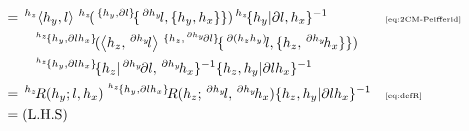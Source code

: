 \documentclass[11pt, reqno]{amsart} %
\newcommand{\act}[1]{\,\sp{#1}\!}
\theoremstyle{definition}
\theoremstyle{remark}
\numberwithin{equation}{section}
\begin{document}
\begin{align*}
  &= \act{h_z}\left<h_y,l\right>\act{h_z}(\act{\{h_y,\partial l\}}\{\act{\partial h_y}l,\{h_y,h_x\}\})\act{h_z}\{h_y|\partial l,h_x\}^{-1} & &\text{\tiny \eqref{eq:2CM-Peifferid}} \\
  &\qquad  \act{\act{h_z}\{h_y,\partial lh_x\}}(\left<h_z,\act{\partial h_y}l\right>\act{\{h_z,\act{\partial h_y}\partial l\}}\{\act{\partial (h_zh_y)}l,\{h_z,\act{\partial h_y}h_x\}\}) \\
  &\qquad 
  \act{\act{h_z}\{h_y,\partial lh_x\}}\{h_z|\act{\partial h_y}\partial l,\act{\partial h_y}h_x\}^{-1}\{h_z,h_y|\partial lh_x\}^{-1} \\
  &= \act{h_z}R(h_y;l,h_x)\act{\act{h_z}\{h_y,\partial lh_x\}}R(h_z;\act{\partial h_y}l,\act{\partial h_y}h_x)\{h_z,h_y|\partial lh_x\}^{-1} & &\text{\tiny \eqref{eq:defR}} \\
  &= (\text{L.H.S})
\end{align*}
\end{document}
